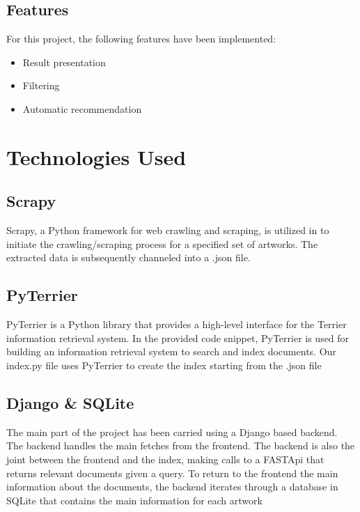 \documentclass[12pt]{spieman}  %
\begin{document}
\begin{spacing}{1}
    \subsection{Features}
    For this project, the following features have been implemented:
    \begin{itemize}
        \item Result presentation
        \item Filtering
        \item Automatic recommendation
    \end{itemize}

    \section{Technologies Used}

    \subsection{Scrapy}
    Scrapy, a Python framework for web crawling and scraping, is utilized in to initiate the crawling/scraping process for a specified set of artworks. The extracted data is subsequently channeled into a .json file.

    \subsection{PyTerrier}
    PyTerrier is a Python library that provides a high-level interface for the Terrier information retrieval system. In the provided code snippet, PyTerrier is used for building an information retrieval system to search and index documents.\newline
    Our index.py file uses PyTerrier to create the index starting from the .json file

    \subsection{Django \& SQLite}
    The main part of the project has been carried using a Django based backend. The backend handles the main fetches from the frontend.
    The backend is also the joint between the frontend and the index, making calls to a FASTApi that returns relevant documents given a query.\newline
    To return to the frontend the main information about the documents, the backend iterates through a database in SQLite that contains the main information for each artwork


\end{spacing}
\end{document}
